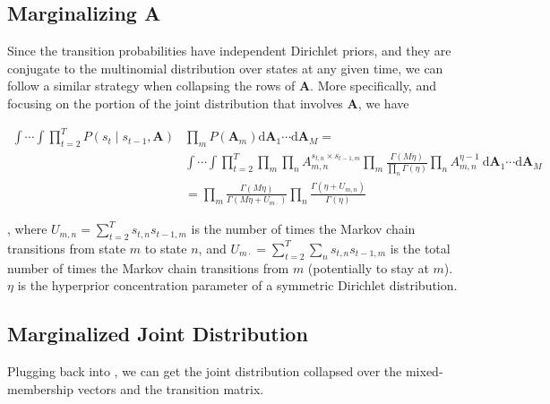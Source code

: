 \documentclass{article}
\begin{document}
\subsection{Marginalizing A}

Since the transition probabilities have independent Dirichlet priors, and they are conjugate to
the multinomial distribution over states at any given time, we can follow a similar strategy when
collapsing the rows of \(\mathbf{A}\). More specifically, and focusing on the portion of the joint distribution
that involves \(\mathbf{A}\), we have

\begin{equation} \label{eq4}
    \begin{aligned}
    \int \cdots \int \prod_{t=2}^{T} P\left(s_{t} \mid s_{t-1},  \mathbf{A}\right) & \prod_{m} P\left(\mathbf{A}_{m}\right) \mathrm{d} \mathbf{A}_{1} \cdots \mathrm{d} \mathbf{A}_{M} = \\
    & \int \cdots \int \prod_{t=2}^{T} \prod_{m} \prod_{n} A_{m, n}^{s_{t, n} \times s_{t-1, m}} \prod_{m} \frac{\Gamma(M \eta)}{\prod_{n} \Gamma(\eta)} \prod_{n} A_{m, n}^{\eta-1} \mathrm{~d} \mathbf{A}_{1} \cdots \mathrm{d} \mathbf{A}_{M} \\
    &= \prod_{m} \frac{\Gamma(M \eta)}{\Gamma\left(M \eta+U_{m \cdot}\right)} \prod_{n} \frac{\Gamma\left(\eta+U_{m, n}\right)}{\Gamma(\eta)}
    \end{aligned}
\end{equation}

, where \(U_{m, n}=\sum_{t=2}^{T} s_{t, n} s_{t-1, m}\) is the number of times the Markov chain transitions from state \(m\) to
state \(n\), and \(U_{m \cdot}=\sum_{t=2}^{T} \sum_{n} s_{t, n} s_{t-1, m}\) is the total number of times the Markov chain transitions
from \(m\) (potentially to stay at \(m\)). \(\eta\) is the hyperprior concentration parameter of a symmetric Dirichlet distribution.

\subsection{Marginalized Joint Distribution}

Plugging  back into , we can get the joint distribution collapsed over the mixed-membership vectors and the transition matrix.
\end{document}
